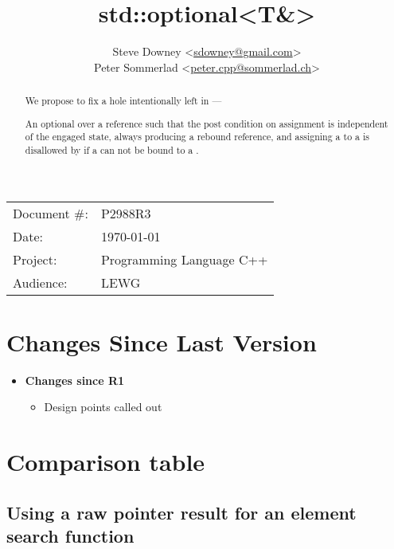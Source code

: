 \documentclass[a4paper,10pt,oneside,openany,final,article]{memoir}
\begin{document}
\title{std::optional<T\&>}
\author{
  Steve Downey \small<\href{mailto:sdowney@gmail.com}{sdowney@gmail.com}> \\
  Peter Sommerlad \small<\href{mailto:peter.cpp@sommerlad.ch}{peter.cpp@sommerlad.ch}> \\
}
\date{} %
\maketitle

\begin{flushright}
  \begin{tabular}{ll}
    Document \#: & P2988R3 \\
    Date: & \today \\
    Project: & Programming Language C++ \\
    Audience: & LEWG
  \end{tabular}
\end{flushright}

\begin{abstract}
  We propose to fix a hole intentionally left in  ---

  An optional over a reference such that the post condition on assignment is independent of the engaged state, always producing a rebound reference, and assigning a  to a  is disallowed by  if a  can not be bound to a .
\end{abstract}

\tableofcontents*

\chapter*{Changes Since Last Version}

\begin{itemize}
\item \textbf{Changes since R1}
  \begin{itemize}
  \item Design points called out
  \end{itemize}
\end{itemize}

\chapter{Comparison table}
\section{Using a raw pointer result for an element search function}
\end{document}
